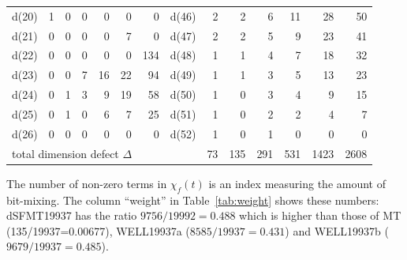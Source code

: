 \documentclass{svmult}
\begin{document}
\begin{table}
\begin{center}
\begin{tabular}{|r|rrrrrr||r|rrrrrr|}
      d(20) & 1 & 0 & 0 & 0 & 0 & 0 & d(46) & 2 & 2 & 6 & 11 & 28 & 50 \\
      d(21) & 0 & 0 & 0 & 0 & 7 & 0 & d(47) & 2 & 2 & 5 & 9 & 23 & 41 \\
      d(22) & 0 & 0 & 0 & 0 & 0 & 134 & d(48) & 1 & 1 & 4 & 7 & 18 & 32 \\
      d(23) & 0 & 0 & 7 & 16 & 22 & 94 & d(49) & 1 & 1 & 3 & 5 & 13 & 23 \\
      d(24) & 0 & 1 & 3 & 9 & 19 & 58 & d(50) & 1 & 0 & 3 & 4 & 9 & 15 \\
      d(25) & 0 & 1 & 0 & 6 & 7 & 25 & d(51) & 1 & 0 & 2 & 2 & 4 & 7 \\
      d(26) & 0 & 0 & 0 & 0 & 0 & 0 & d(52) & 1 & 0 & 1 & 0 & 0 & 0 \\ \hline
      \multicolumn{8}{|l|}{total dimension defect $\Delta$} 
      & 73 & 135 & 291 & 531 & 1423 & 2608 \\ \hline
    \end{tabular}
  \end{center}
\end{table}

\begin{remark}
  The number of non-zero terms in $\chi_f(t)$ is an index measuring
  the amount of bit-mixing.  The column ``weight'' in 
  Table~\ref{tab:weight} shows these numbers: 
  dSFMT19937 has the ratio $9756/19992=0.488$ which is higher than those of MT
  (135/19937=0.00677), WELL19937a ($8585/19937=0.431$) and
  WELL19937b ($9679/19937=0.485$).
\end{remark}
\end{document}
